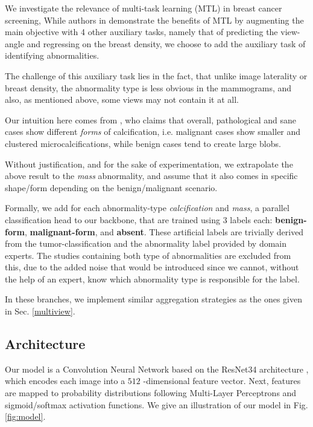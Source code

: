 \documentclass[11pt]{article}
\begin{document}
We investigate the relevance of multi-task learning (MTL) in breast cancer screening,
While authors in \autocite{tardy22} demonstrate the benefits of MTL
by augmenting the main objective with
4 other auxiliary tasks, namely that of predicting the view-angle and
regressing on the breast density,
we choose to add the auxiliary task of identifying abnormalities.

The challenge of this auxiliary task lies
in the fact, that unlike image laterality or breast density, the abnormality type
is less obvious in the mammograms, and also, as mentioned above, some views
may not contain it at all.

Our intuition here comes from \autocite{azam21}, who claims that overall, pathological and sane
cases show different \emph{forms} of calcification, i.e. malignant cases show smaller and clustered
microcalcifications, while benign cases tend to create large blobs.

Without justification, and for the sake of experimentation,
we extrapolate the above result to the \emph{mass} abnormality, and assume
that it also comes in specific shape/form depending on the benign/malignant
scenario.

Formally, we add for each abnormality-type \emph{calcification} and \emph{mass},
a parallel classification head to our backbone, that are trained using
3 labels each: \textbf{benign-form}, \textbf{malignant-form}, and \textbf{absent}.
These artificial labels are trivially derived from the tumor-classification and
the abnormality label provided by domain experts.
The studies containing both type of abnormalities are excluded from this, due to the added noise that would be introduced since we cannot, without the help of an expert, know which abnormality type is responsible for the label.

In these branches, we implement similar aggregation strategies
as the ones given in Sec. \ref{multiview}.

\subsection{Architecture}
\label{sec:orgd134c35}

Our model is a Convolution Neural Network based on the ResNet34
architecture \autocite{he15}, which encodes each image into a \(512\) -dimensional feature
vector.
Next, features are mapped to probability distributions following Multi-Layer Perceptrons
and sigmoid/softmax activation functions.
We give an illustration of our model in Fig. \ref{fig:model}.
\end{document}
